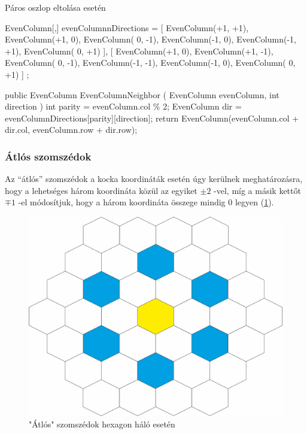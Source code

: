 Páros oszlop eltolása esetén
\begin{cpp}
EvenColumn[,] evenColumnnDirections = 
{ 
   [ 
      EvenColumn(+1, +1), EvenColumn(+1,  0), EvenColumn( 0, -1),
      EvenColumn(-1,  0), EvenColumn(-1, +1), EvenColumn( 0, +1) 
   ],
   [  
      EvenColumn(+1,  0), EvenColumn(+1, -1), EvenColumn( 0, -1),
      EvenColumn(-1, -1), EvenColumn(-1,  0), EvenColumn( 0, +1) 
   ]
};

public EvenColumn EvenColumnNeighbor
(
   EvenColumn evenColumn, 
   int direction
)
{
   int parity = evenColumn.col \% 2;
   EvenColumn dir = evenColumnDirections[parity][direction];
   return EvenColumn(evenColumn.col + dir.col, evenColumn.row + dir.row);
}   
\end{cpp}

\subsubsection{Átlós szomszédok}

\noindent Az “átlós” szomszédok a kocka koordináták esetén úgy kerülnek meghatározásra, hogy a lehetséges három koordináta közül az egyiket $ \pm 2$ -vel, míg a másik kettőt $\mp 1$ -el módosítjuk, hogy a három koordináta összege mindig $0$ legyen (\ref{fig:Diagonals}).

\begin{figure}[h!]
\centering
\includegraphics[scale=0.3]{kepek/Diagonals.jpg}
\caption{"Átlós" szomszédok hexagon háló esetén}
\label{fig:Diagonals}
\end{figure}

